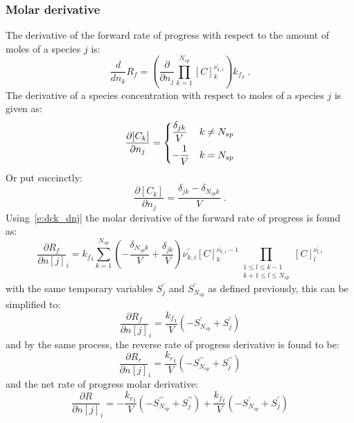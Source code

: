 \documentclass[12pt]{article}
\newcommand{\ns}{\ensuremath{{N_{sp}}}}
\begin{document}
\subsubsection{Molar derivative}
The derivative of the forward rate of progress with respect to the amount of moles of a species $j$ is:
\begin{equation}
 \frac{d}{d n_{k}} {R_f} = \left(\frac{\partial}{\partial n_{j}} \prod_{k=1}^{\ns} [C]_{k}^{\nu^{\prime}_{k,i}}\right) {k_f}_{i} \;.
\end{equation}
The derivative of a species concentration with respect to moles of a species $j$ is given as:
\begin{equation}
 \frac{\partial [C_k]}{\partial n_j} =
 \begin{dcases}
 \frac{\delta_{j k}}{V} & k \ne \ns \\
 -\frac{1}{V} & k = \ns
 \end{dcases}
\end{equation}
Or put succinctly:
\begin{equation}
\label{e:dck_dnj}
\frac{\partial [C_k]}{\partial n_j} = \frac{\delta_{j k} - \delta_{\ns k}}{V} \;.
\end{equation}
Using~\eqref{e:dck_dnj} the molar derivative of the forward rate of progress is found as:
\begin{equation}
 \frac{\partial {R_f} }{\partial n[j] }_{i} = {k_f}_{i} \sum_{k=1}^{\ns} \left(- \frac{\delta_{\ns k}}{V} + \frac{\delta_{j k}}{V}\right) \nu^{\prime}_{k,i} [C]_{k}^{\nu^{\prime}_{k,i} - 1} \prod_{\substack{1 \leq l \leq k - 1\\k + 1 \leq l \leq \ns}} [C]_{l}^{\nu^{\prime}_{l,i}}
\end{equation}
with the same temporary variables $S^{\prime}_{j}$ and $S^{\prime}_{\ns}$ as defined previously, this can be simplified to:
\begin{equation}
 \label{e:dropf_dnj}
 \frac{\partial {R_f} }{\partial n[j] }_{i} = \frac{{k_f}_{i}}{V} \left(- S^{\prime}_{\ns} + S^{\prime}_{j}\right)
\end{equation}
and by the same process, the reverse rate of progress derivative is found to be:
\begin{equation}
 \label{e:dropr_dnj}
 \frac{\partial {R_r} }{\partial n[j] }_{i} = \frac{{k_r}_{i}}{V} \left(- S^{\prime\prime}_{\ns} + S^{\prime\prime}_{j}\right)
\end{equation}
and the net rate of progress molar derivative:
\begin{equation}
 \frac{\partial R }{\partial n[j] }_{i} = - \frac{{k_r}_{i}}{V} \left(- S^{\prime\prime}_{\ns} + S^{\prime\prime}_{j}\right) + \frac{{k_f}_{i}}{V} \left(- S^{\prime}_{\ns} + S^{\prime}_{j}\right)
\end{equation}
\end{document}
